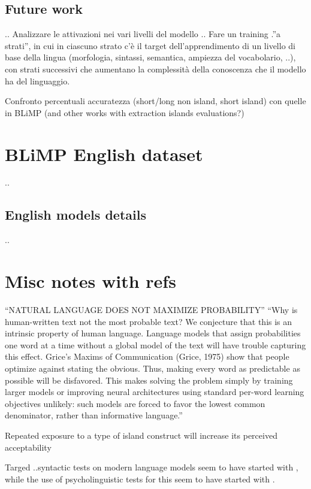 \subsection{Future work}
..
Analizzare le attivazioni nei vari livelli del modello ..
Fare un training .”a strati”, in cui in ciascuno strato c’è il target dell’apprendimento di un livello di base della lingua (morfologia, sintassi, semantica, ampiezza del vocabolario, ..), con strati successivi che aumentano la complessità della conoscenza che il modello ha del linguaggio.


Confronto percentuali accuratezza (short/long non island, short island) con quelle in BLiMP
(and other works with extraction islands evaluations?)


\section{BLiMP English dataset}
..
\subsection{English models details}
..

\section{Misc notes with refs}

“NATURAL LANGUAGE DOES NOT MAXIMIZE PROBABILITY” 
“Why is human-written text not the most probable text? We conjecture that this is an intrinsic property of human language. Language models that assign probabilities one word at a time without a global model of the text will have trouble capturing this effect. Grice’s Maxims of Communication (Grice, 1975) show that people optimize against stating the obvious. Thus, making every word as predictable as possible will be disfavored. This makes solving the problem simply by training larger models or improving neural architectures using standard per-word learning objectives unlikely: such models are forced to favor the lowest common denominator, rather than informative language.” 
\citep{holtzman2019curious}

Repeated exposure to a type of island construct will increase its perceived acceptability 
\citep{chaves2014subject}

Targed ..syntactic tests on modern language models seem to have started with \citet{linzen2016assessing}, while the use of psycholinguistic tests for this seem to have started with \citet{futrell2018rnns}.

